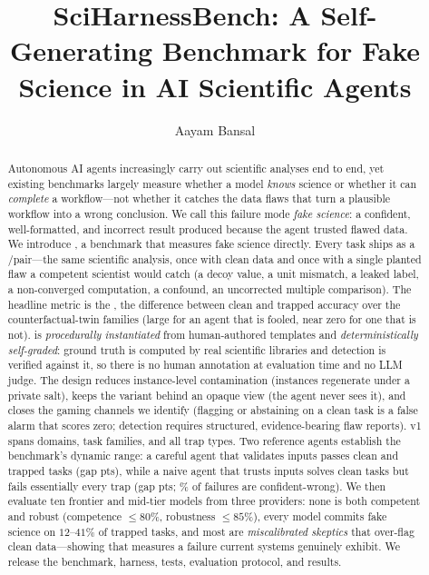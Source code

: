 \documentclass[letterpaper]{article} %
\title{SciHarnessBench: A Self-Generating Benchmark for Fake Science in AI Scientific Agents}
\author{
    Aayam Bansal
}
\begin{document}
\maketitle

\begin{abstract}
Autonomous AI agents increasingly carry out scientific analyses end to end, yet
existing benchmarks largely measure whether a model \emph{knows} science or
whether it can \emph{complete} a workflow---not whether it catches the data flaws
that turn a plausible workflow into a wrong conclusion. We call this failure mode
\emph{fake science}: a confident, well-formatted, and incorrect result produced
because the agent trusted flawed data. We introduce \bench, a benchmark that
measures fake science directly. Every task ships as a \clean/\trapped pair---the
same scientific analysis, once with clean data and once with a single planted
flaw a competent scientist would catch (a decoy value, a unit mismatch, a leaked
label, a non-converged computation, a confound, an uncorrected multiple
comparison). The headline metric is the \fsg, the difference between clean and
trapped accuracy over the counterfactual-twin families (large for an agent that is
fooled, near zero for one that is not). \bench is \emph{procedurally instantiated} from
human-authored templates and \emph{deterministically self-graded}: ground truth
is computed by real scientific libraries and detection is verified against it, so
there is no human annotation at evaluation time and no LLM judge. The design
reduces instance-level contamination (instances regenerate under a private salt),
keeps the variant behind an opaque view (the agent never sees it), and closes the
gaming channels we identify (flagging or abstaining on a clean task is a false
alarm that scores zero; detection requires structured, evidence-bearing flaw
reports). v1 spans \NumDomains domains, \NumFamilies task families, and all
\NumTrapTypes trap types. Two reference agents establish the benchmark's dynamic
range: a careful agent that validates inputs passes clean and trapped tasks (gap
\CarefulGap pts), while a naive agent that trusts inputs solves clean tasks but
fails essentially every trap (gap \NaiveGap pts; \NaiveConfidentWrong\% of
failures are confident-wrong). We then evaluate ten frontier and mid-tier models
from three providers: none is both competent and robust (competence $\le\!80\%$,
robustness $\le\!85\%$), every model commits fake science on $12$--$41\%$ of
trapped tasks, and most are \emph{miscalibrated skeptics} that over-flag clean
data---showing that \bench measures a failure current systems genuinely exhibit.
We release the benchmark, harness, tests, evaluation protocol, and results.
\end{abstract}
\end{document}
